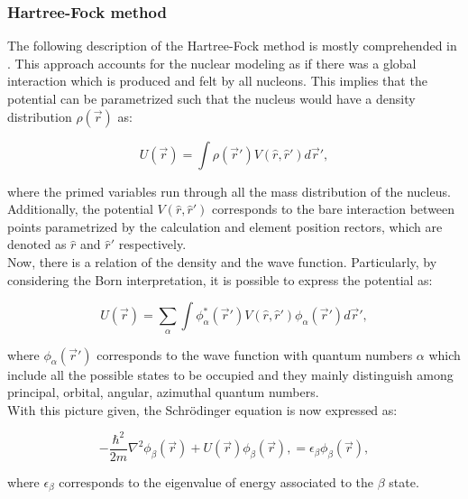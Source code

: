 \documentclass[openany]{book}
\begin{document}
\subsubsection{Hartree-Fock method} \label{ssub:micro_HartreeFock}

The following description of the Hartree-Fock method is mostly comprehended in \cite{heyde_2004}. This approach accounts for the nuclear modeling as if there was a global interaction which is produced and felt by all nucleons. This implies that the potential can be parametrized such that the nucleus would have a density distribution $\rho(\vec r)$ as:

\begin{equation}\label{eq:micro_hartreeFock_potential}
	U(\vec r) = \int \rho (\vec r') V(\hat r, \hat r') d \vec r ',
\end{equation}

where the primed variables run through all the mass distribution of the nucleus. Additionally, the potential $V(\hat r, \hat r')$ corresponds to the bare interaction between points parametrized by the calculation and element position rectors, which are denoted as $\hat r$ and $\hat r'$ respectively. \\

Now, there is a relation of the density and the wave function. Particularly, by considering the Born interpretation, it is possible to express the potential as: 

\begin{equation}\label{eq:micro_hartreeFock_potential_waveFunction}
	U(\vec r) = \sum_\alpha \int \phi_\alpha^{*} (\vec r')  V(\hat r, \hat r') \phi_\alpha(\vec r') d \vec r ',
\end{equation}

where $ \phi_\alpha(\vec r') $ corresponds to the wave function with quantum numbers $\alpha$ which include all the possible states to be occupied and they mainly distinguish among principal, orbital, angular, azimuthal quantum numbers. \\

With this picture given, the Schrödinger equation is now expressed as: 

\begin{equation}\label{eq:micro_hartreeFock_schrodinger}
	-\frac{\hbar^2}{2m} \nabla^2 \phi_\beta(\vec r) + U(\vec r)  \phi_\beta(\vec r), = \epsilon_\beta  \phi_\beta(\vec r), 
\end{equation}

where $\epsilon_\beta$ corresponds to the eigenvalue of energy associated to the $\beta$ state. \\
\end{document}
